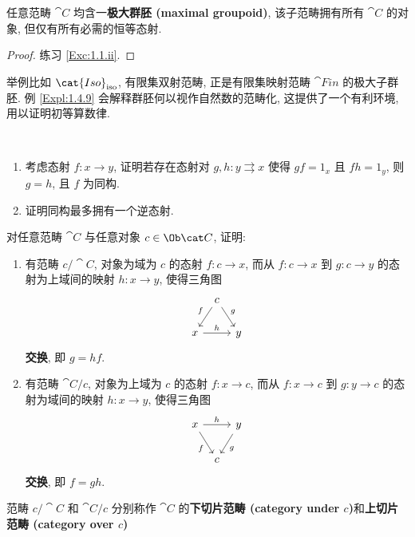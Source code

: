 \begin{lemma}
    任意范畴 \(\cat C\) 均含一\textbf{极大群胚 (maximal groupoid)}, 该子范畴拥有所有 \(\cat C\) 的对象, 但仅有所有必需的恒等态射.
\end{lemma}
\begin{proof}
    练习 \ref{Exc:1.1.ii}.
\end{proof}
\par 举例比如 \(\cat{Iso}_{\rm iso}\), 有限集双射范畴, 正是有限集映射范畴 \(\cat{Fin}\) 的极大子群胚. 例 \ref{Expl:1.4.9} 会解释群胚何以视作自然数的范畴化, 这提供了一个有利环境, 用以证明初等算数律.
\Exercises
\exercise\label{Exc:1.1.ii}{
    \ \vspace{-.5em}\begin{enumerate}[label=(\roman*)]
        \item 考虑态射 \(f\colon x\to y\), 证明若存在态射对 \(g,h\colon y\rightrightarrows x\) 使得 \(gf=1_x\) 且 \(fh=1_y\), 则 \(g=h\), 且 \(f\) 为同构.
        \item 证明同构最多拥有一个逆态射.
    \end{enumerate}
}
\exercise\label{Exc:1.1.iii}{
    对任意范畴 \(\cat C\) 与任意对象 \(c\in\Ob\cat C\), 证明:
    \ \vspace{-.5em}\begin{enumerate}[label=(\roman*)]
        \item 有范畴 \(c/\cat C\), 对象为域为 \(c\) 的态射 \(f\colon c\to x\), 而从 \(f\colon c\to x\) 到 \(g\colon c\to y\) 的态射为上域间的映射 \(h\colon x\to y\), 使得三角图\[
            \begin{tikzcd}[ampersand replacement=\&, column sep=tiny]
                \& c \ar[dl, "f"'] \ar[dr, "g"] \& \\
                x \ar[rr, "h"] \& \& y
            \end{tikzcd}
        \]\textbf{交换}, 即 \(g=hf\).
        \item 有范畴 \(\cat C/c\), 对象为上域为 \(c\) 的态射 \(f\colon x\to c\), 而从 \(f\colon x\to c\) 到 \(g\colon y\to c\) 的态射为域间的映射 \(h\colon x\to y\), 使得三角图\[
            \begin{tikzcd}[ampersand replacement=\&, column sep=tiny]
                x \ar[rr, "h"] \ar[dr, "f"'] \& \& y \ar[dl, "g"] \\
                \& c \&
            \end{tikzcd}
        \]
        \textbf{交换}, 即 \(f=gh\).
    \end{enumerate}
    范畴 \(c/\cat C\) 和 \(\cat C/c\) 分别称作 \(\cat C\) 的\textbf{下切片范畴 (category under \(c\))}和\textbf{上切片范畴 (category over \(c\))}
}

